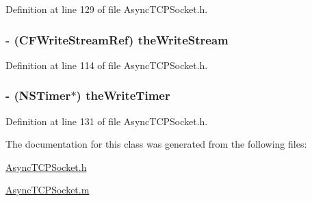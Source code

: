 Definition at line 129 of file AsyncTCPSocket.h.

\hypertarget{interface_async_t_c_p_socket_aec37f271ac2a31efa3a76b450c550002}{
\subsubsection[{theWriteStream}]{\setlength{\rightskip}{0pt plus 5cm}-\/ (CFWriteStreamRef) {\bf theWriteStream}}}
\label{interface_async_t_c_p_socket_aec37f271ac2a31efa3a76b450c550002}


Definition at line 114 of file AsyncTCPSocket.h.

\hypertarget{interface_async_t_c_p_socket_ac1a3ea539394e9e5650e17b76623b0a8}{
\subsubsection[{theWriteTimer}]{\setlength{\rightskip}{0pt plus 5cm}-\/ (NSTimer$\ast$) {\bf theWriteTimer}}}
\label{interface_async_t_c_p_socket_ac1a3ea539394e9e5650e17b76623b0a8}


Definition at line 131 of file AsyncTCPSocket.h.



The documentation for this class was generated from the following files:\begin{DoxyCompactItemize}
\item 
\hyperlink{_async_t_c_p_socket_8h}{AsyncTCPSocket.h}\item 
\hyperlink{_async_t_c_p_socket_8m}{AsyncTCPSocket.m}\end{DoxyCompactItemize}
